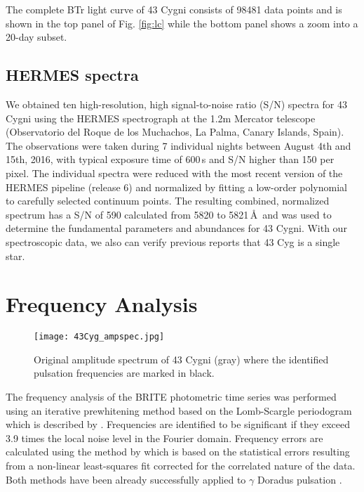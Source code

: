 \documentclass{aa}
\begin{document}
The complete BTr light curve of 43 Cygni consists of 98481 data points and is shown in the top panel of Fig. \ref{fig:lc} while the bottom panel shows a zoom into a 20-day subset. 



\subsection{HERMES spectra}

We obtained ten high-resolution, high signal-to-noise ratio (S/N) spectra for 43 Cygni using the HERMES spectrograph \citep[$R = 85,000$, $\lambda$ = 377 $-$ 900\,nm,][]{raskin2011}  at the 1.2m Mercator telescope (Observatorio del Roque de los Muchachos, La Palma, Canary Islands, Spain). The observations were taken during 7 individual nights between August 4th and 15th, 2016, with typical exposure time of 600\,s and S/N higher than 150 per pixel. 
The individual spectra were reduced with the most recent
version of the HERMES pipeline (release 6) and normalized by fitting a low-order polynomial to carefully selected continuum points. The resulting combined, normalized spectrum has a S/N of 590 calculated from 5820 to 5821\,\AA\ and was used to determine the fundamental parameters and abundances for 43 Cygni. With our spectroscopic data, we also can verify previous reports \citep[e.g.,][]{henry2005,gerbaldi2007} that 43 Cyg is a single star. 




\section{Frequency Analysis}

\begin{figure}[t]
	\begin{center}
	\texttt{[image: 43Cyg\_ampspec.jpg]}
	\caption{Original amplitude spectrum of 43 Cygni (gray) where the identified pulsation frequencies are marked in black.} 
	\label{fig:ampspec} 
	\end{center} 
\end{figure}



The frequency analysis of the BRITE photometric time series was performed using an iterative prewhitening method based on the Lomb-Scargle periodogram which is described by \citet{vanreeth2015aa}. Frequencies are identified to be significant if they exceed 3.9 times the local noise level in the Fourier domain. 
Frequency errors are calculated using the method by \citet{schwarzenberg2003} which is based on the statistical errors resulting from a non-linear least-squares fit corrected for the correlated nature of the data. Both methods have been already successfully applied to $\gamma$ Doradus pulsation \citep[e.g.,][]{vanreeth2015apjs}.
\end{document}
